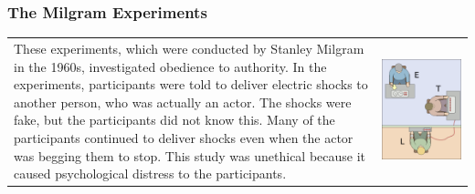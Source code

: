 \documentclass[
  b5paper]{book}
\begin{document}
\hypertarget{the-milgram-experiments}{%
\subsubsection*{The Milgram Experiments}\label{the-milgram-experiments}}

\begin{longtable}[]{@{}
  >{\raggedright\arraybackslash}p{}
  >{\raggedright\arraybackslash}p{}@{}}
\toprule\noalign{}
\endhead
\bottomrule\noalign{}
\endlastfoot
These experiments, which were conducted by Stanley Milgram in the 1960s, investigated obedience to authority. In the experiments, participants were told to deliver electric shocks to another person, who was actually an actor. The shocks were fake, but the participants did not know this. Many of the participants continued to deliver shocks even when the actor was begging them to stop. This study was unethical because it caused psychological distress to the participants. & \includegraphics[width=1\textwidth,height=\textheight]{images/Milgram_experiment.png} \\
\end{longtable}
\end{document}
